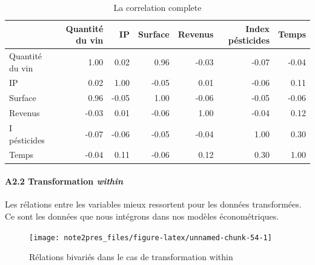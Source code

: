 \documentclass[11pt,]{article}
\let\oldparagraph\paragraph
\renewcommand{\paragraph}[1]{\oldparagraph{#1}\mbox{}}
\begin{document}
\FloatBarrier

\FloatBarrier

\begin{table}[ht]
\centering
\begin{tabular}{l|rrrrrr}
  \hline
 & Quantité du vin & IP & Surface & Revenus & Index pésticides & Temps \\ 
  \hline
Quantité du vin & 1.00 & 0.02 & 0.96 & -0.03 & -0.07 & -0.04 \\ 
  IP & 0.02 & 1.00 & -0.05 & 0.01 & -0.06 & 0.11 \\ 
  Surface & 0.96 & -0.05 & 1.00 & -0.06 & -0.05 & -0.06 \\ 
  Revenus & -0.03 & 0.01 & -0.06 & 1.00 & -0.04 & 0.12 \\ 
  I pésticides & -0.07 & -0.06 & -0.05 & -0.04 & 1.00 & 0.30 \\ 
  Temps & -0.04 & 0.11 & -0.06 & 0.12 & 0.30 & 1.00 \\ 
   \hline
\end{tabular}
\caption{La correlation complete} 
\end{table}

\FloatBarrier

\newpage

\hypertarget{a2.2-transformation-within}{%
\paragraph{\texorpdfstring{A2.2 Transformation
\emph{within}}{A2.2 Transformation within}}\label{a2.2-transformation-within}}

Les rélations entre les variables mieux ressortent pour les données
transformées. Ce sont les données que nous intégrons dans nos modèles
économétriques.

\FloatBarrier

\begin{figure}[!htbp]

{\centering \texttt{[image: note2pres\_files/figure-latex/unnamed-chunk-54-1]} 

}

\caption{Rélations bivariés dans le cas de transformation within}\label{fig:unnamed-chunk-54}
\end{figure}

\FloatBarrier

\FloatBarrier
\end{document}
